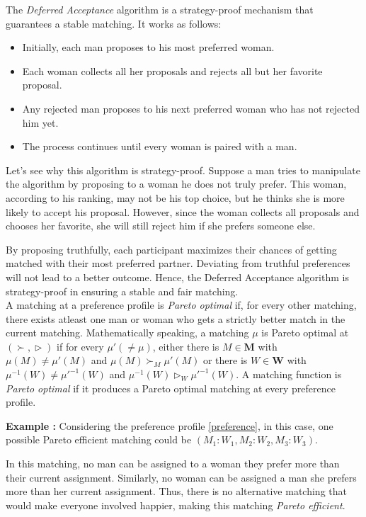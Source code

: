 \documentclass[a4paper,11pt,table]{article}
\newcommand{\rva}{\vartriangleright}
\theoremstyle{definition}
\theoremstyle{remark}
\begin{document}
The \textit{Deferred Acceptance} algorithm is a strategy-proof mechanism that guarantees a stable matching. It works as follows:
\begin{itemize}
    \item Initially, each man proposes to his most preferred woman.
    \item Each woman collects all her proposals and rejects all but her favorite proposal.
    \item Any rejected man proposes to his next preferred woman who has not rejected him yet.
\item The process continues until every woman is paired with a man.
\end{itemize}
Let's see why this algorithm is strategy-proof. Suppose a man tries to manipulate the algorithm by proposing to a woman he does not truly prefer. This woman, according to his ranking, may not be his top choice, but he thinks she is more likely to accept his proposal. However, since the woman collects all proposals and chooses her favorite, she will still reject him if she prefers someone else.

By proposing truthfully, each participant maximizes their chances of getting matched with their most preferred partner. Deviating from truthful preferences will not lead to a better outcome. Hence, the Deferred Acceptance algorithm is strategy-proof in ensuring a stable and fair matching.\\

A matching at a preference profile is \textit{Pareto optimal} if, for every other matching, there exists atleast one man or woman who gets a strictly better match in the current matching. Mathematically speaking, a matching $\mu$ is Pareto optimal at $(\succ,\rva)$ if for every $\mu' (\neq \mu)$, either there is $M\in \pmb{M}$ with $\mu(M)\neq \mu'(M)$ and $\mu(M)\succ_M\mu'(M)$ or there is $W\in \pmb{W}$ with $\mu^{-1}(W)\neq \mu'^{-1}(W)$ and $\mu^{-1}(W)\rva_W\mu'^{-1}(W)$.  A matching function is \textit{Pareto optimal} if it produces a Pareto optimal matching at every preference profile.

\textbf{Example : }Considering the preference profile \ref{preference}, in this case, one possible Pareto efficient matching could be $(M_1:W_1, M_2:W_2, M_3:W_3)$.

In this matching, no man can be assigned to a woman they prefer more than their current assignment. Similarly, no woman can be assigned a man she prefers more than her current assignment. Thus, there is no alternative matching that would make everyone involved happier, making this matching \textit{Pareto efficient}.
\end{document}
